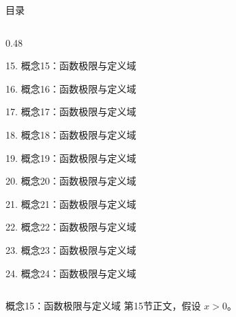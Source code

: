 \documentclass[aspectratio=169,10pt,fontset=fandol]{ctexbeamer}
\begin{document}
\begin{frame}[t,fragile]{目录}
\begin{columns}[T,onlytextwidth]
\begin{column}{0.48\textwidth}
{\color{blue}\small 15. 概念15：函数极限与定义域\par}\vspace{0.22em}
{\color{gray!40}\small 16. 概念16：函数极限与定义域\par}\vspace{0.22em}
{\color{gray!40}\small 17. 概念17：函数极限与定义域\par}\vspace{0.22em}
{\color{gray!40}\small 18. 概念18：函数极限与定义域\par}\vspace{0.22em}
{\color{gray!40}\small 19. 概念19：函数极限与定义域\par}\vspace{0.22em}
{\color{gray!40}\small 20. 概念20：函数极限与定义域\par}\vspace{0.22em}
{\color{gray!40}\small 21. 概念21：函数极限与定义域\par}\vspace{0.22em}
{\color{gray!40}\small 22. 概念22：函数极限与定义域\par}\vspace{0.22em}
{\color{gray!40}\small 23. 概念23：函数极限与定义域\par}\vspace{0.22em}
{\color{gray!40}\small 24. 概念24：函数极限与定义域\par}\vspace{0.22em}
\end{column}
\end{columns}
\end{frame}
\begin{frame}[t,fragile]{概念15：函数极限与定义域}
\normalsize
{\normalsize
第15节正文，假设 $x>0$。
}
\end{frame}
\end{document}
